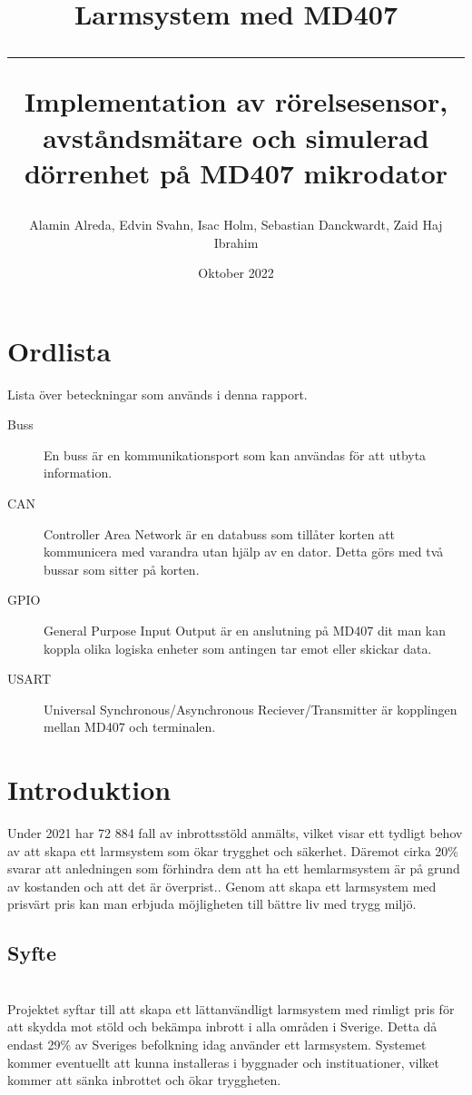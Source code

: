 \documentclass{article}
\title{\textbf{Larmsystem med MD407}\\ 
         \hspace{10cm}
         \hrule
        \hspace{10cm}
        \small Implementation av rörelsesensor, avståndsmätare och simulerad dörrenhet på MD407 mikrodator}
\author{Alamin Alreda, Edvin Svahn, Isac Holm, Sebastian Danckwardt, Zaid Haj Ibrahim}
\date{Oktober 2022}
\begin{document}
\maketitle
\newpage
\tableofcontents
\newpage
\section*{Ordlista}
Lista över beteckningar som används i denna rapport.
\begin{description}

\item[Buss] En buss är en kommunikationsport som kan användas för att utbyta information.

\item[CAN] Controller Area Network är en databuss som tillåter korten att kommunicera med varandra utan hjälp av en dator. Detta görs med två bussar som sitter på korten.

\item[GPIO] General Purpose Input Output är en anslutning på MD407 dit man kan koppla olika logiska enheter som antingen tar emot eller skickar data.

\item[USART] Universal Synchronous/Asynchronous Reciever/Transmitter är kopplingen mellan MD407 och terminalen.


\end{description}
 \newpage

\setcounter{page}{1}
\section{Introduktion}
Under 2021 har 72 884 fall av inbrottsstöld anmälts, vilket visar ett tydligt behov av att skapa ett larmsystem som ökar trygghet och säkerhet.\cite{BRa} Däremot cirka 20\% svarar att anledningen som förhindra dem att ha ett hemlarmsystem är på grund av kostanden och att det är överprist.\cite{MoFor}.
Genom att skapa ett larmsystem med prisvärt pris kan man erbjuda möjligheten till bättre liv med trygg miljö.

\subsection{Syfte}
\\
Projektet syftar till att skapa ett lättanvändligt larmsystem med rimligt pris för att skydda mot stöld och bekämpa inbrott i alla områden i Sverige. Detta då endast 29\% av Sveriges befolkning idag använder ett larmsystem.\cite{SSF} Systemet kommer eventuellt att kunna installeras i byggnader och instituationer, vilket kommer att sänka inbrottet och ökar tryggheten.
\end{document}
